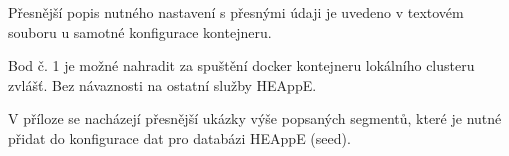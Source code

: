 Přesnější popis nutného nastavení s přesnými údaji je uvedeno v textovém souboru u samotné konfigurace kontejneru.

Bod č. 1 je možné nahradit za spuštění docker kontejneru lokálního clusteru zvlášť. Bez návaznosti na ostatní služby HEAppE.


V příloze se nacházejí přesnější ukázky výše popsaných segmentů, které je nutné přidat do konfigurace dat pro databázi HEAppE (seed).





